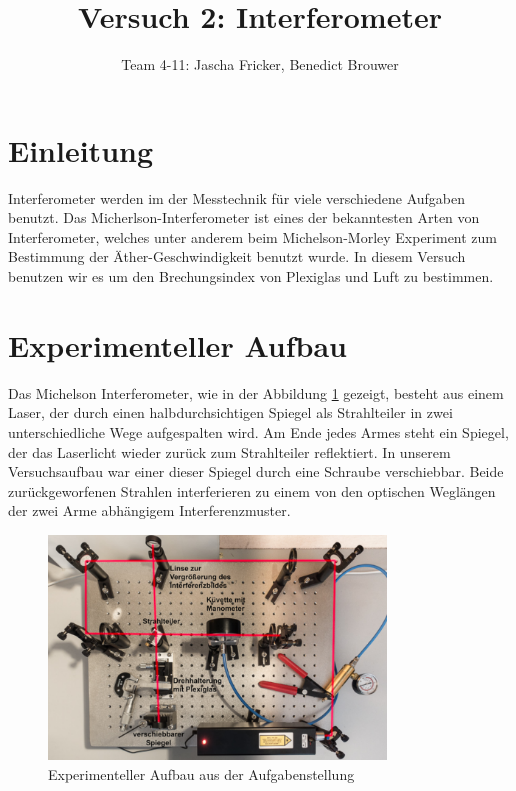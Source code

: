 \documentclass[11pt, a4paper]{article}
\title{Versuch 2: Interferometer}
\author{Team 4-11: Jascha Fricker, Benedict Brouwer}
\begin{document}
    \maketitle

    \tableofcontents

    \newpage

    \section{Einleitung}

    Interferometer werden im der Messtechnik für viele verschiedene Aufgaben benutzt. Das Micherlson-Interferometer ist eines der bekanntesten Arten von Interferometer, welches unter anderem beim Michelson-Morley Experiment zum Bestimmung der Äther-Geschwindigkeit benutzt wurde. In diesem Versuch benutzen wir es um den Brechungsindex von Plexiglas und Luft zu bestimmen.

    \section{Experimenteller Aufbau}

    Das Michelson Interferometer, wie in der Abbildung \ref{fig:auf} gezeigt, besteht aus einem Laser, der durch einen halbdurchsichtigen Spiegel als Strahlteiler in zwei unterschiedliche Wege aufgespalten wird. Am Ende jedes Armes steht ein Spiegel, der das Laserlicht wieder zurück zum Strahlteiler reflektiert. In unserem Versuchsaufbau war einer dieser Spiegel durch eine Schraube verschiebbar. Beide zurückgeworfenen Strahlen interferieren zu einem von den optischen Weglängen der zwei Arme abhängigem Interferenzmuster.

    \begin{figure}
        \centering
        \includegraphics[width=0.8\textwidth]{Screenshot 2023-03-13 5.35.50 PM.png}
        \caption{Experimenteller Aufbau aus der Aufgabenstellung \cite{intauf}}
        \label{fig:auf}
    \end{figure}
\end{document}
